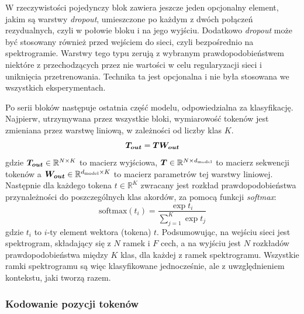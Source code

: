 W rzeczywistości pojedynczy blok zawiera jeszcze jeden opcjonalny element, jakim są warstwy
\emph{dropout}, umieszczone po każdym z dwóch połączeń rezydualnych, czyli w połowie bloku i na jego
wyjściu. Dodatkowo \emph{dropout} może być stosowany również przed wejściem do sieci, czyli
bezpośrednio na spektrogramie. Warstwy tego typu zerują z wybranym prawdopodobieństwem niektóre z
przechodzących przez nie wartości w celu regularyzacji sieci i uniknięcia przetrenowania. Technika
ta jest opcjonalna i nie była stosowana we wszystkich eksperymentach.

Po serii bloków następuje ostatnia część modelu, odpowiedzialna za klasyfikację. Najpierw,
utrzymywana przez wszystkie bloki, wymiarowość tokenów jest zmieniana przez warstwę liniową, w
zależności od liczby klas $K$.
\begin{equation}
    \boldsymbol{T_{out}} = \boldsymbol{T} \boldsymbol{W_{out}}
\end{equation}
gdzie $\boldsymbol{T_{out}} \in \mathbb{R}^{N \times K}$ to macierz wyjściowa, $\boldsymbol{T} \in \mathbb{R}^{N \times d_{\mathrm{model}}}$ to
macierz sekwencji tokenów a $\boldsymbol{W_{out}} \in \mathbb{R}^{d_{\mathrm{model}} \times K}$ to macierz parametrów tej
warstwy liniowej. Następnie dla każdego tokena $t \in \mathbb{R}^K$ zwracany jest rozkład
prawdopodobieństwa przynależności do poszczególnych klas akordów, za pomocą funkcji \emph{softmax}:
\begin{equation}
    \textrm{softmax}(t_i) = \frac{\exp{t_i}}{\sum_{j=1}^{K}\exp{t_j}}
\end{equation}
gdzie $t_i$ to $i$-ty element wektora (tokena) $t$. Podsumowując, na wejściu sieci jest spektrogram,
składający się z $N$ ramek i $F$ cech, a na wyjściu jest $N$ rozkładów prawdopodobieństwa między $K$
klas, dla każdej z ramek spektrogramu. Wszystkie ramki spektrogramu są więc klasyfikowane
jednocześnie, ale z uwzględnieniem kontekstu, jaki tworzą razem.

\subsubsection{Kodowanie pozycji tokenów}

